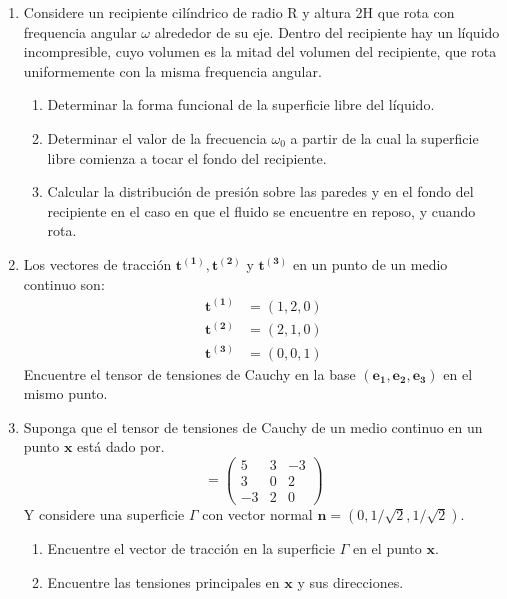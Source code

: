 \documentclass[12pt,a4paper]{article}
\begin{document}
\begin{enumerate}
\begin{figure}[h]
    \end{figure}
    \item Considere un recipiente cilíndrico de radio R y altura 2H
    que rota con frequencia angular $\omega$
    alrededor de su eje. Dentro del recipiente hay un líquido incompresible,
    cuyo volumen es la mitad del volumen del recipiente, que rota uniformemente con la
    misma frequencia angular.
    \begin{enumerate}
        \item Determinar la forma funcional de la superficie libre del líquido.
        \item Determinar el valor de la frecuencia $\omega_0$
        a partir de la cual la superficie libre
        comienza a tocar el fondo del recipiente.
        \item Calcular la distribución de presión sobre las paredes y en el fondo del recipiente
        en el caso en que el fluido se encuentre en reposo, y cuando rota.
    \end{enumerate}
    \item Los vectores de tracción $\mathbf{t^{(1)}, t^{(2)}}$ y $\mathbf{t^{(3)}}$ en un punto de un medio continuo son:   
    \begin{align}
        \mathbf{t^{(1)}} &= (1,2,0) \\
        \mathbf{t^{(2)}} &= (2,1,0) \\
        \mathbf{t^{(3)}} &= (0,0,1)
    \end{align} 
    Encuentre el tensor de tensiones de Cauchy en la base $\mathbf{(e_1,e_2,e_3)}$ en el mismo punto.
    \item Suponga que el tensor de tensiones de Cauchy de un medio continuo en un punto $\mathbf{x}$ está dado por.
    \begin{equation}
        [\sigma]=\begin{pmatrix}
            5 & 3 & -3\\
            3 & 0 & 2\\
            -3 & 2 & 0
            \end{pmatrix}
    \end{equation}
    Y considere una superficie $\Gamma$ con vector normal $\mathbf{n}=(0,1/\sqrt{2},1/\sqrt{2})$.
    \begin{enumerate}
        \item Encuentre el vector de tracción en la superficie $\Gamma$ en el punto $\mathbf{x}$.
        \item Encuentre las tensiones principales en $\mathbf{x}$ y sus direcciones.
    \end{enumerate}
\end{enumerate}
\end{document}
